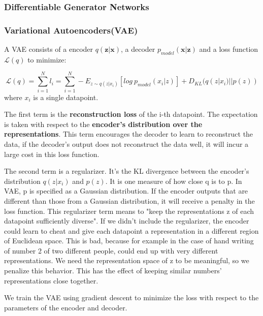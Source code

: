 \documentclass[12pt]{article}
\numberwithin{equation}{section}
\begin{document}
\subsubsection{Differentiable Generator Networks}
\subsubsection{Variational Autoencoders(VAE)}
	A VAE consists of a encoder $q(\bm{z}|\bm{x})$, a decoder $p_{model}(\bm{x}|\bm{z})$ and a loss function $\mathcal{L}(q)$ to minimize: \par
	\begin{equation}
		\mathcal{L}(q) = \sum^N_{i=1} l_i=\sum^N_{i=1}-E_{z \sim q(z|x_i)}[log \ p_{model}(x_i|z)] + D_{KL}(q(z|x_i)||p(z))
	\end{equation}
where $x_i$ is a single datapoint. \par
	The first term is the \textbf{reconstruction loss} of the i-th datapoint. The expectation is taken with respect to the \textbf{encoder's distribution over the representations}. This term encourages the decoder to learn to reconstruct the data, if the decoder's output does not reconstruct the data well, it will incur a large cost in this loss function. \par
	The second term is a regularizer. It's the KL divergence between the encoder's distribution $q(z|x_i)$ and $p(z)$. It is one measure of how close q is to p. In VAE, p is specified as a Gaussian distribution. If the encoder outputs that are different than those from a Gaussian distribution, it will receive a penalty in the loss function. This regularizer term means to "keep the representations z of each datapoint sufficiently diverse". If we didn't include the regularizer, the encoder could learn to cheat and give each datapoint a representation in a different region of Euclidean space. This is bad, because for example in the case of hand writing of number 2 of two different people, could end up with very different representations. We need the representation space of z to be meaningful, so we penalize this behavior. This has the effect of keeping similar numbers' representations close together. \par
	We train the VAE using gradient descent to minimize the loss with respect to the parameters of the encoder and decoder. \par
\end{document}

